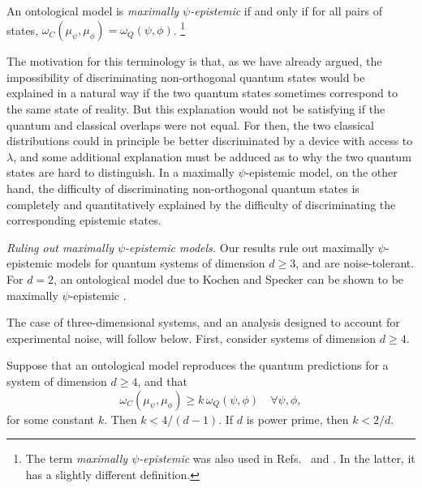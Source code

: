 \begin{dfn}
An ontological model is \emph{maximally $\psi$-epistemic} if and only if  for all pairs of states, $\omega_C(\mu_\psi,\mu_\phi) = \omega_Q(\psi,\phi)$. \footnote{The term \emph{maximally $\psi$-epistemic} was also used in Refs.~\cite{Maroney2012a} and \cite{Leifer2013}. In the latter, it has a slightly different definition.} 
\end{dfn}
The motivation for this terminology is that, as we have already argued, the impossibility of discriminating non-orthogonal quantum states would be explained in a natural way if the two quantum states sometimes correspond to the same state of reality. But this explanation would not be satisfying if the quantum and classical overlaps were not equal. For then, the two classical distributions could in principle be better discriminated by a device with access to $\lambda$, and some additional explanation must be adduced as to why the two quantum states are hard to distinguish. In a maximally $\psi$-epistemic model, on the other hand, the difficulty of discriminating non-orthogonal quantum states is completely and quantitatively explained by the difficulty of discriminating the corresponding epistemic states.

\textit{Ruling out maximally $\psi$-epistemic models.} Our results rule out maximally $\psi$-epistemic models for quantum systems of dimension $d \geq 3$, and are noise-tolerant. For $d=2$, an ontological model due to Kochen and Specker \cite{Kochen1967} can be shown to be maximally $\psi$-epistemic \cite{peterlewisprivcomm}. 

The case of three-dimensional systems, and an analysis designed to account for experimental noise, will follow below. First, consider systems of dimension $d\geq 4$. 
\begin{thm}\label{maintheorem}
Suppose that an ontological model reproduces the quantum predictions for a system of dimension $d\geq 4$, and that 
\[
\omega_C(\mu_\psi,\mu_\phi) \geq k \,\omega_Q(\psi,\phi) \quad \forall \psi,\phi ,
\]
for some constant $k$. Then $k < 4 / (d-1)$. If $d$ is power prime, then $k < 2/d$.
\end{thm}

